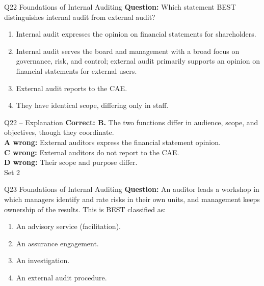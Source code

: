 \documentclass[aspectratio=169,10pt]{beamer}
\begin{document}
\begin{frame}[t]{Q22 \hfill {\scriptsize Foundations of Internal Auditing}}
	\small
	\textbf{Question:} Which statement BEST distinguishes internal audit from external audit?
	\begin{enumerate}[label=\Alph*.,itemsep=1pt,topsep=3pt]
			\item Internal audit expresses the opinion on financial statements for shareholders.
			\item Internal audit serves the board and management with a broad focus on governance, risk, and control; external audit primarily supports an opinion on financial statements for external users.
			\item External audit reports to the CAE.
			\item They have identical scope, differing only in staff.
	\end{enumerate}
\end{frame}

\begin{frame}[t]{Q22 -- Explanation}
	\footnotesize
	\textbf{Correct: B.} The two functions differ in audience, scope, and objectives, though they coordinate. \\[5pt]
\textbf{A wrong:} External auditors express the financial statement opinion. \\[3pt]
\textbf{C wrong:} External auditors do not report to the CAE. \\[3pt]
\textbf{D wrong:} Their scope and purpose differ. \\[3pt]
	\vfill {\tiny Set 2}
\end{frame}

\begin{frame}[t]{Q23 \hfill {\scriptsize Foundations of Internal Auditing}}
	\small
	\textbf{Question:} An auditor leads a workshop in which managers identify and rate risks in their own units, and management keeps ownership of the results. This is BEST classified as:
	\begin{enumerate}[label=\Alph*.,itemsep=1pt,topsep=3pt]
			\item An advisory service (facilitation).
			\item An assurance engagement.
			\item An investigation.
			\item An external audit procedure.
	\end{enumerate}
\end{frame}
\end{document}
